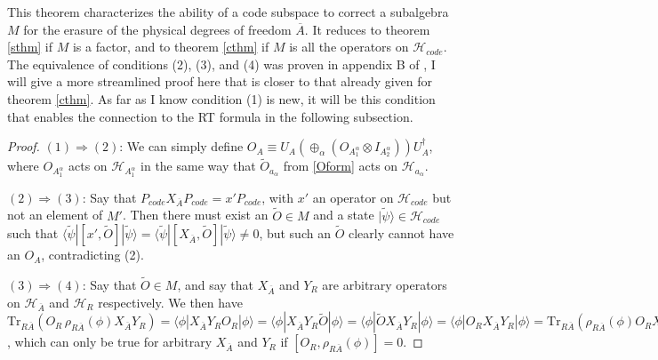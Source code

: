\documentclass[12pt]{article}
\newcommand{\lan}{\langle}
\newcommand{\ran}{\rangle}
\newcommand{\Tr}{\mathrm{Tr}}
\newcommand{\wt}{\widetilde}
\newcommand{\Hh}{\mathcal{H}}
\newcommand{\HAb}{\mathcal{H}_{\ol{A}}}
\newcommand{\Ab}{\ol{A}}
\newcommand{\Hc}{\mathcal{H}_{code}}
\newcommand{\ol}{\overline}
\newcommand{\Pc}{P_{code}}
\begin{document}
This theorem characterizes the ability of a code subspace to correct a subalgebra $M$ for the erasure of the physical degrees of freedom $\Ab$.  It reduces to theorem \eqref{sthm} if $M$ is a factor, and to theorem \eqref{cthm} if $M$ is all the operators on $\Hc$.  The equivalence of conditions (2), (3), and (4) was proven in appendix B of \cite{Almheiri:2014lwa}, I will give a more streamlined proof here that is closer to that already given for theorem \eqref{cthm}.  As far as I know condition (1) is new, it will be this condition that enables the connection to the RT formula in the following subsection.  
\begin{proof}

$(1)\Rightarrow (2)$: We can simply define $O_A\equiv U_A\left(\oplus_\alpha \left(O_{A_1^\alpha}\otimes I_{A_2^\alpha}\right)\right)U_A^\dagger$, where $O_{A_1^\alpha}$ acts on $\Hh_{A_1^\alpha}$ in the same way that $\wt{O}_{a_\alpha}$ from \eqref{Oform} acts on $\Hh_{a_\alpha}$.

$(2)\Rightarrow (3)$: Say that $\Pc X_{\Ab} \Pc=x'\Pc$, with $x'$ an operator on $\Hc$ but not an element of $M'$.  Then there must exist an $\wt{O}\in M$ and a state $|\wt{\psi}\ran\in \Hc$ such that $\lan \wt{\psi}|[x',\wt{O}]|\wt{\psi}\ran=\lan \wt{\psi}|[X_{\Ab},\wt{O}]|\wt{\psi}\ran\neq 0$, but such an $\wt{O}$ clearly cannot have an $O_A$, contradicting (2).

$(3)\Rightarrow (4)$: Say that $\wt{O}\in M$, and say that  $X_{\Ab}$ and $Y_R$ are arbitrary operators on $\HAb$ and $\Hh_R$ respectively.  We then have
$\Tr_{R\Ab}\left(O_R\,\rho_{R\Ab}(\phi)X_{\Ab} Y_R\right)=\lan\phi|X_{\Ab}Y_R O_R|\phi\ran=\lan\phi|X_{\Ab}Y_R \wt{O}|\phi\ran=\lan\phi|\wt{O}X_{\Ab}Y_R|\phi\ran=\lan\phi|O_RX_{\Ab}Y_R|\phi\ran=\Tr_{R\Ab}\left(\rho_{R\Ab}(\phi)O_RX_{\Ab} Y_R\right)$, which can only be true for arbitrary $X_{\Ab}$ and $Y_R$ if $[O_R,\rho_{R\Ab}(\phi)]=0$.


\end{proof}
\end{document}
